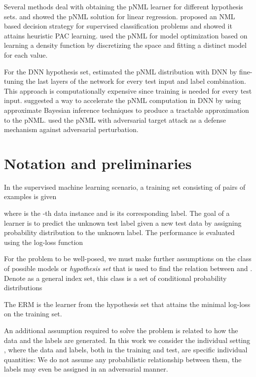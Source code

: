 \documentclass{article}
\newcommand{\minisection}[1]{\vspace{2mm}\noindent{\textbf{#1.}}}
\begin{document}
Several methods deal with obtaining the pNML learner for different hypothesis sets.
\citet{bibas2019new} and \citet{bibas2021predictive} showed the pNML solution for linear regression. \citet{rosas2020learning} proposed an NML based decision strategy for supervised classification problems and showed it attains heuristic PAC learning.
\citet{fu2021offline} used the pNML for model optimization based on learning a density function by discretizing the space and fitting a distinct model for each value.

For the DNN hypothesis set,
\citet{bibas2019deep} estimated the pNML distribution with DNN by fine-tuning the last layers of the network for every test input and label combination. This approach is computationally expensive since training is needed for every test input.
\citet{zhou2020amortized} suggested a way to accelerate the pNML computation in DNN by using approximate Bayesian inference techniques to produce a tractable approximation to the pNML.
\citet{pesso2021utilizing} used the pNML with adversarial target attack as a defense mechanism against adversarial perturbation.

\section{Notation and preliminaries} 
\label{sec:preliminaries}
In the supervised machine learning scenario, a training set consisting of  pairs of examples is given

where  is the -th data instance and  is its corresponding label.
The goal of a learner is to predict the unknown test label  given a new test data  by assigning probability distribution  to the unknown label. 
The performance is evaluated using the log-loss function


For the problem to be well-posed, we must make further assumptions on the class of possible models or {\em hypothesis set} that is used to find the relation between  and .
Denote  as a general index set, this class is a set of conditional probability distributions 

The ERM is the learner from the hypothesis set that attains the minimal log-loss on the training set.

\minisection{The individual setting}
An additional assumption required to solve the problem is related to how the data and the labels are generated.
In this work we consider the individual setting \citep{merhav1998universal,fogel2018universal,bibas2019new,bibas2019deep},
where the data and labels, both in the training and test, are specific individual quantities: We do not assume any probabilistic relationship between them, the labels may even be assigned in an adversarial manner.  
\end{document}
